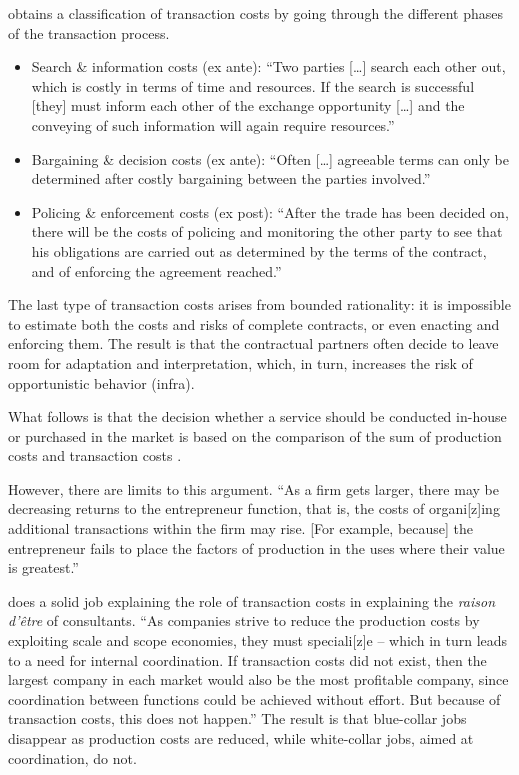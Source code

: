 \documentclass[12pt]{article}
\begin{document}
\citet[147-148]{dahlman1979} obtains a classification of transaction
costs by going through the different phases of the transaction process.

\begin{itemize}
\item
  Search \& information costs (ex ante): ``Two parties {[}\ldots{]}
  search each other out, which is costly in terms of time and resources.
  If the search is successful {[}they{]} must inform each other of the
  exchange opportunity {[}\ldots{]} and the conveying of such
  information will again require resources.''
\item
  Bargaining \& decision costs (ex ante): ``Often {[}\ldots{]} agreeable
  terms can only be determined after costly bargaining between the
  parties involved.''
\item
  Policing \& enforcement costs (ex post): ``After the trade has been
  decided on, there will be the costs of policing and monitoring the
  other party to see that his obligations are carried out as determined
  by the terms of the contract, and of enforcing the agreement
  reached.''
\end{itemize}

The last type of transaction costs arises from bounded rationality: it
is impossible to estimate both the costs and risks of complete
contracts, or even enacting and enforcing them. \citep[ 53]{aubert1996}
The result is that the contractual partners often decide to leave room
for adaptation and interpretation, which, in turn, increases the risk of
opportunistic behavior (infra).

What follows is that the decision whether a service should be conducted
in-house or purchased in the market is based on the comparison of the
sum of production costs and transaction costs \citep[
12]{armbruster2006}.

However, there are limits to this argument. ``As a firm gets larger,
there may be decreasing returns to the entrepreneur function, that is,
the costs of organi{[}z{]}ing additional transactions within the firm
may rise. {[}For example, because{]} the entrepreneur fails to place the
factors of production in the uses where their value is greatest.''
\citep[ 394-395]{coase1937}

\citet[31]{canback1998} does a solid job explaining the role of
transaction costs in explaining the \emph{raison d'être} of consultants.
``As companies strive to reduce the production costs by exploiting scale
and scope economies, they must speciali{[}z{]}e -- which in turn leads
to a need for internal coordination. If transaction costs did not exist,
then the largest company in each market would also be the most
profitable company, since coordination between functions could be
achieved without effort. But because of transaction costs, this does not
happen.'' The result is that blue-collar jobs disappear as production
costs are reduced, while white-collar jobs, aimed at coordination, do
not.
\end{document}
